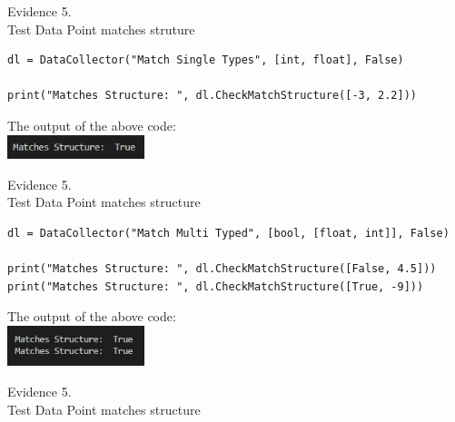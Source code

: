 \begin{flushleft}
\begin{center}
        {\large Evidence 5.\rn } \\ 
        \vspace{0.3cm}
        Test Data Point matches struture \\

        \begin{verbatim}
dl = DataCollector("Match Single Types", [int, float], False)

print("Matches Structure: ", dl.CheckMatchStructure([-3, 2.2]))
        \end{verbatim}

        The output of the above code: \\
        \includegraphics[width=4cm]{Images/Testing/T4.3.1.PNG} \\
        \vspace{1cm}

        {\large Evidence 5.\rn } \\ 
        \vspace{0.3cm}
        Test Data Point matches structure \\

        \begin{verbatim}
dl = DataCollector("Match Multi Typed", [bool, [float, int]], False)

print("Matches Structure: ", dl.CheckMatchStructure([False, 4.5]))
print("Matches Structure: ", dl.CheckMatchStructure([True, -9]))
        \end{verbatim}
            
        The output of the above code: \\
        \includegraphics[width=4cm]{Images/Testing/T4.4.1.PNG} \\
        \vspace{1cm}

        {\large Evidence 5.\rn } \\ 
        \vspace{0.3cm}
        Test Data Point matches structure \\


\end{center}
\end{flushleft}
